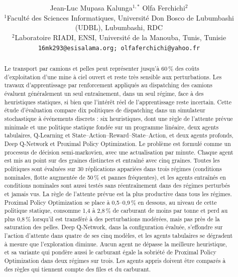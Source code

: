\documentclass[11pt,a4paper]{article}
\title{\textbf{\corr{Apprentissage par renforcement profond pour le dispatching des camions dans les mines à ciel ouvert : productivité, efficacité énergétique et robustesse selon le régime de fonctionnement}}}
\author{%
\begin{tabular}{c}
Jean-Luc Mupasa Kalunga$^{1,*}$ \qquad Olfa Ferchichi$^{2}$\\[0.5em]
{\small $^{1}$Faculté des Sciences Informatiques, Université Don Bosco de Lubumbashi (UDBL), Lubumbashi, RDC}\\
{\small $^{2}$Laboratoire RIADI, ENSI, Université de la Manouba, Tunis, Tunisie}\\[0.3em]
{\small\texttt{16mk293@esisalama.org; olfaferchichi@yahoo.fr}}
\end{tabular}%
}
\date{} %
\newif\ifrevmarks
\newcommand{\revtag}[1]{\ifrevmarks\textsuperscript{\textcolor{red!70!black}{\scriptsize[#1]}}\fi}
\newenvironment{revbloc}[1]{\par\ifrevmarks\color{revcolor}\noindent\revtag{#1}\ \fi}{\par}
\newif\ifcorrmarks
\newcommand{\corr}[1]{\ifcorrmarks\textcolor{corrcolor}{#1}\else#1\fi}
\begin{document}
\maketitle


\begin{abstract}
\begin{revbloc}{m1, m2, M1, M3, v3, T31}
Le transport par camions et pelles peut représenter jusqu'à 60\,\% des coûts d'exploitation d'une mine à ciel ouvert et reste très sensible aux perturbations. Les travaux d'apprentissage par renforcement appliqués au dispatching des camions évaluent généralement un seul entraînement, dans un seul régime, face à des heuristiques statiques, si bien que l'intérêt réel de l'apprentissage reste incertain. \corr{Cette étude d'évaluation compare} dix politiques de dispatching dans un simulateur stochastique à événements discrets : six heuristiques, dont une règle de l'attente prévue minimale et une politique \corr{statique} fondée sur un programme linéaire, deux agents tabulaires, Q-Learning et State--Action--Reward--State--Action, et deux agents profonds, Deep Q-Network et Proximal Policy Optimization. Le problème est formulé comme un processus de décision semi-markovien, avec une actualisation par minute. \corr{Chaque agent est mis au point sur des graines distinctes et entraîné avec cinq graines.} Toutes les politiques sont évaluées sur 30 réplications appariées dans trois régimes (conditions nominales, flotte augmentée de 50\,\% et pannes fréquentes), et les agents entraînés en conditions nominales sont aussi testés sans réentraînement dans des régimes perturbés et jamais vus. La règle de l'attente prévue est la plus productive dans tous les régimes. Proximal Policy Optimization se place à 0,5--0,9\,\% en dessous, au niveau de \corr{cette politique statique}, consomme 1,4 à 2,8\,\% de carburant de moins par tonne et \corr{perd au plus 0,8\,\% lorsqu'il est transféré à des perturbations modérées, mais pas près de la saturation des pelles}. Deep Q-Network\corr{, dans la configuration évaluée,} s'effondre sur l'action d'attente dans quatre de ses cinq modèles, et les agents tabulaires se dégradent à mesure que l'exploration diminue. \corr{Aucun agent ne dépasse la meilleure heuristique, et sa variante qui pondère aussi le carburant égale la sobriété de Proximal Policy Optimization dans deux régimes sur trois. Les agents appris doivent être comparés à des règles qui tiennent compte des files et du carburant.}
\end{revbloc}
\end{abstract}
\end{document}
